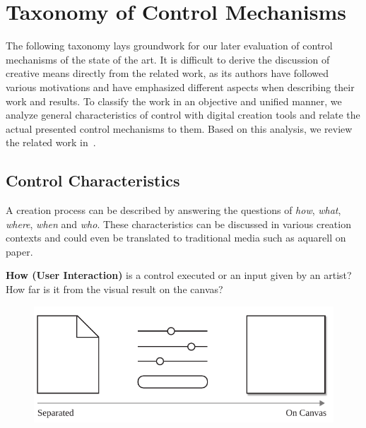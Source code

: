 

\section{Taxonomy of Control Mechanisms}\label{sec:taxo_control_mechanism}

The following taxonomy lays groundwork for our later evaluation of control mechanisms of the state of the art. It is difficult to derive the discussion of creative means directly from the related work, as its authors have followed various motivations and have emphasized different aspects when describing their work and results. To classify the work in an objective and unified manner, we analyze general characteristics of control with digital creation tools and relate the actual presented control mechanisms to them. Based on this analysis, we review the related work in~.

\newcommand{\controlParamsFigWidth}{0.9}

\subsection{Control Characteristics}\label{control_charateristics}
A creation process can be described by answering the questions of \textit{how}, \textit{what}, \textit{where}, \textit{when} and \textit{who}. These characteristics can be discussed in various creation contexts and could even be translated to traditional media such as aquarell on paper.


\noindent\textbf{How (User Interaction)} is a control executed or an input given by an artist? How far is it from the visual result on the canvas? 

\begin{figure}[H]
    \centering
        \includegraphics[width=\controlParamsFigWidth\linewidth]{figures/control_paradigms/how.pdf}
\end{figure}

